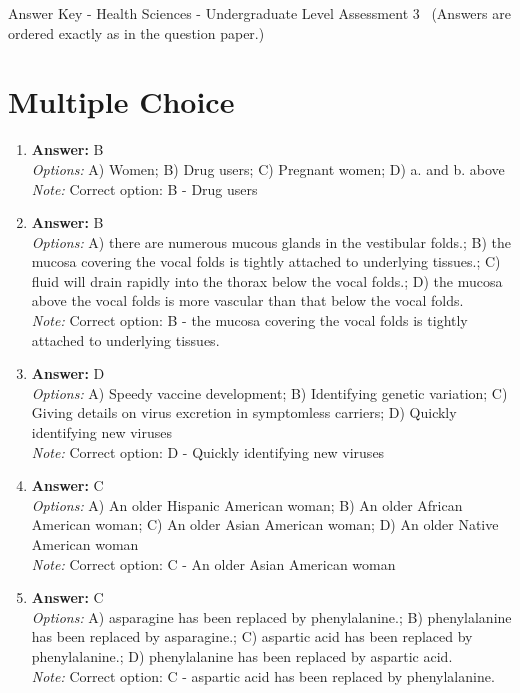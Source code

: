 \documentclass[12pt]{article}
\begin{document}
\begin{center}
Answer Key - Health Sciences - Undergraduate Level Assessment 3 \
\small (Answers are ordered exactly as in the question paper.)
\end{center}

\section*{Multiple Choice}
\begin{enumerate}[label=\arabic*.]
\item \textbf{Answer:} B
\\ \textit{Options:} A) Women; B) Drug users; C) Pregnant women; D) a. and b. above
\\ \textit{Note:} Correct option: B - Drug users
\item \textbf{Answer:} B
\\ \textit{Options:} A) there are numerous mucous glands in the vestibular folds.; B) the mucosa covering the vocal folds is tightly attached to underlying tissues.; C) fluid will drain rapidly into the thorax below the vocal folds.; D) the mucosa above the vocal folds is more vascular than that below the vocal folds.
\\ \textit{Note:} Correct option: B - the mucosa covering the vocal folds is tightly attached to underlying tissues.
\item \textbf{Answer:} D
\\ \textit{Options:} A) Speedy vaccine development; B) Identifying genetic variation; C) Giving details on virus excretion in symptomless carriers; D) Quickly identifying new viruses
\\ \textit{Note:} Correct option: D - Quickly identifying new viruses
\item \textbf{Answer:} C
\\ \textit{Options:} A) An older Hispanic American woman; B) An older African American woman; C) An older Asian American woman; D) An older Native American woman
\\ \textit{Note:} Correct option: C - An older Asian American woman
\item \textbf{Answer:} C
\\ \textit{Options:} A) asparagine has been replaced by phenylalanine.; B) phenylalanine has been replaced by asparagine.; C) aspartic acid has been replaced by phenylalanine.; D) phenylalanine has been replaced by aspartic acid.
\\ \textit{Note:} Correct option: C - aspartic acid has been replaced by phenylalanine.
\end{enumerate}
\end{document}
